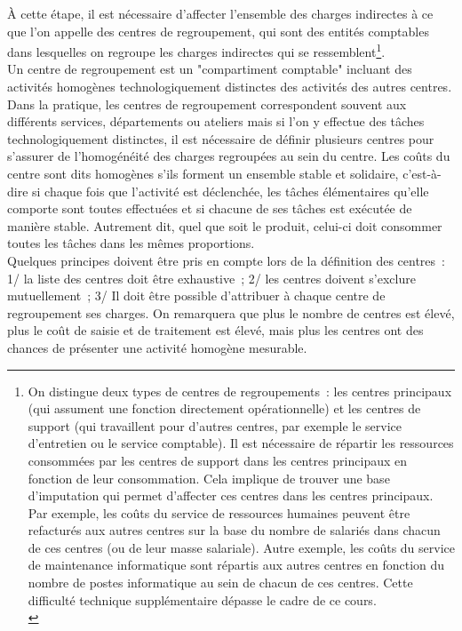 \documentclass{tufte-handout}
\begin{document}
\begin{enumerate}
\begin{itemize}
\end{itemize}
À cette étape, il est nécessaire d'affecter l'ensemble des charges indirectes à ce que l'on appelle des centres de regroupement, qui sont des entités comptables dans lesquelles on regroupe les charges indirectes qui se ressemblent\footnote{On distingue deux types de centres de regroupements : les centres principaux (qui assument une fonction directement opérationnelle) et les centres de support (qui travaillent pour d'autres centres, par exemple le service d'entretien ou le service comptable). Il est nécessaire de répartir les ressources consommées par les centres de support dans les centres principaux en fonction de leur consommation. Cela implique de trouver une base d'imputation qui permet d'affecter ces centres dans les centres principaux. Par exemple, les coûts du service de ressources humaines peuvent être refacturés aux autres centres sur la base du nombre de salariés dans chacun de ces centres (ou de leur masse salariale). Autre exemple, les coûts du service de maintenance informatique sont répartis aux autres centres en fonction du nombre de postes informatique au sein de chacun de ces centres. Cette difficulté technique supplémentaire dépasse le cadre de ce cours.\\}.\\
Un centre de regroupement est un "compartiment comptable" incluant des activités homogènes technologiquement distinctes des activités des autres centres. Dans la pratique, les centres de regroupement correspondent souvent aux différents services, départements ou ateliers mais si l'on y effectue des tâches technologiquement distinctes, il est nécessaire de définir plusieurs centres pour s'assurer de l'homogénéité des charges regroupées au sein du centre. Les coûts du centre sont dits homogènes s'ils forment un ensemble stable et solidaire, c'est-à-dire si chaque fois que l'activité est déclenchée, les tâches élémentaires qu'elle comporte sont toutes effectuées et si chacune de ses tâches est exécutée de manière stable. Autrement dit, quel que soit le produit, celui-ci doit consommer toutes les tâches dans les mêmes proportions.\\
Quelques principes doivent être pris en compte lors de la définition des centres : 1/ la liste des centres doit être exhaustive ; 2/ les centres doivent s'exclure mutuellement ; 3/ Il doit être possible d'attribuer à chaque centre de regroupement ses charges. On remarquera que plus le nombre de centres est élevé, plus le coût de saisie et de traitement est élevé, mais plus les centres ont des chances de présenter une activité homogène mesurable.\\

\end{enumerate}
\end{document}
